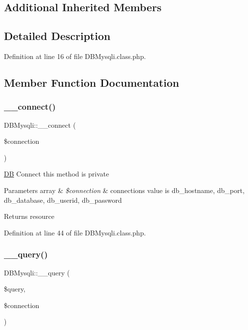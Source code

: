 \subsection*{Additional Inherited Members}


\subsection{Detailed Description}


Definition at line 16 of file D\+B\+Mysqli.\+class.\+php.



\subsection{Member Function Documentation}
\hypertarget{classDBMysqli_a7c041395f7926e0ec84186aa9eabc138}{}\label{classDBMysqli_a7c041395f7926e0ec84186aa9eabc138} 
\subsubsection{\texorpdfstring{\+\_\+\+\_\+connect()}{\_\_connect()}}
{\footnotesize\ttfamily D\+B\+Mysqli\+::\+\_\+\+\_\+connect (\begin{DoxyParamCaption}\item[{}]{\$connection }\end{DoxyParamCaption})}

\hyperlink{classDB}{DB} Connect this method is private 
\begin{DoxyParams}[1]{Parameters}
array & {\em \$connection} & connection\textquotesingle{}s value is db\+\_\+hostname, db\+\_\+port, db\+\_\+database, db\+\_\+userid, db\+\_\+password \\
\hline
\end{DoxyParams}
\begin{DoxyReturn}{Returns}
resource 
\end{DoxyReturn}


Definition at line 44 of file D\+B\+Mysqli.\+class.\+php.

\hypertarget{classDBMysqli_aa7e47178c283abd8ba1bb7c8d0a31c66}{}\label{classDBMysqli_aa7e47178c283abd8ba1bb7c8d0a31c66} 
\subsubsection{\texorpdfstring{\+\_\+\+\_\+query()}{\_\_query()}}
{\footnotesize\ttfamily D\+B\+Mysqli\+::\+\_\+\+\_\+query (\begin{DoxyParamCaption}\item[{}]{\$query,  }\item[{}]{\$connection }\end{DoxyParamCaption})}

